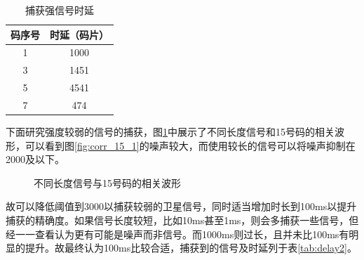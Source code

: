 \documentclass[a4paper, 10pt]{article}
\begin{document}
\begin{table}[ht]
    \centering
    \caption{捕获强信号时延}
    \label{tab:delay1}
    \begin{tabular}{cc}
        \toprule
        码序号 & 时延（码片） \\
        \midrule
        1      & 1000         \\
        3      & 1451         \\
        5      & 4541         \\
        7      & 474          \\
        \bottomrule
    \end{tabular}
\end{table}

下面研究强度较弱的信号的捕获，图\ref{fig:corr_15}中展示了不同长度信号和15号码的相关波形，可以看到图\ref{fig:corr_15_1}的噪声较大，而使用较长的信号可以将噪声抑制在2000及以下。

\begin{figure}[ht]
    \centering
    \caption{不同长度信号与15号码的相关波形}
    \label{fig:corr_15}
\end{figure}

故可以降低阈值到3000以捕获较弱的卫星信号，同时适当增加时长到100ms以提升捕获的精确度。如果信号长度较短，比如10ms甚至1ms，则会多捕获一些信号，但经一一查看认为更有可能是噪声而非信号。而1000ms则过长，且并未比100ms有明显的提升。故最终认为100ms比较合适，捕获到的信号及时延列于表\ref{tab:delay2}。
\end{document}
